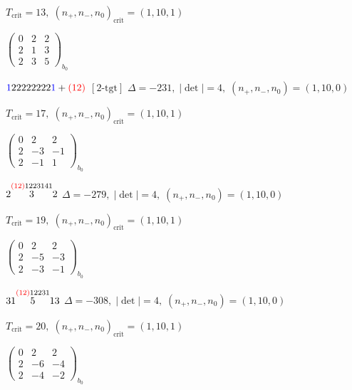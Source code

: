 \documentclass[10pt]{article}
\begin{document}
\hspace{1em}$T_{\text{crit}}=13,\; (n_+,n_-,n_0)_{\text{crit}}=(1,10,1)$

\hspace{2em}$\left(\begin{smallmatrix}0 & 2 & 2 \\ 2 & 1 & 3 \\ 2 & 3 & 5\end{smallmatrix}\right)_{\!b_0}$

$\textcolor{blue}{1}22222222\textcolor{blue}{1}+\textcolor{red}{(12)}$ $\scriptstyle [2\text{-tgt}]$ \quad $\Delta=-231,\; |\det|=4,\; (n_+,n_-,n_0)=(1,10,0)$

\hspace{1em}$T_{\text{crit}}=17,\; (n_+,n_-,n_0)_{\text{crit}}=(1,10,1)$

\hspace{2em}$\left(\begin{smallmatrix}0 & 2 & 2 \\ 2 & -3 & -1 \\ 2 & -1 & 1\end{smallmatrix}\right)_{\!b_0}$

\smallskip

$2\overset{\textcolor{red}{(12)}1223141}{3}2$ \quad $\Delta=-279,\; |\det|=4,\; (n_+,n_-,n_0)=(1,10,0)$

\hspace{1em}$T_{\text{crit}}=19,\; (n_+,n_-,n_0)_{\text{crit}}=(1,10,1)$

\hspace{2em}$\left(\begin{smallmatrix}0 & 2 & 2 \\ 2 & -5 & -3 \\ 2 & -3 & -1\end{smallmatrix}\right)_{\!b_0}$

\smallskip

$31\overset{\textcolor{red}{(12)}12231}{5}13$ \quad $\Delta=-308,\; |\det|=4,\; (n_+,n_-,n_0)=(1,10,0)$

\hspace{1em}$T_{\text{crit}}=20,\; (n_+,n_-,n_0)_{\text{crit}}=(1,10,1)$

\hspace{2em}$\left(\begin{smallmatrix}0 & 2 & 2 \\ 2 & -6 & -4 \\ 2 & -4 & -2\end{smallmatrix}\right)_{\!b_0}$
\end{document}
